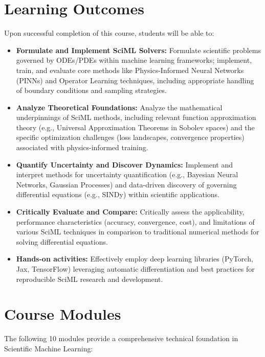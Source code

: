 \documentclass[11pt,fourier]{article}
\begin{document}
\section*{Learning Outcomes}
Upon successful completion of this course, students will be able to:
\begin{itemize}
    \item \textbf{Formulate and Implement SciML Solvers:} Formulate scientific problems governed by ODEs/PDEs within machine learning frameworks; implement, train, and evaluate core methods like Physics-Informed Neural Networks (PINNs) and Operator Learning techniques, including appropriate handling of boundary conditions and sampling strategies.
    \item \textbf{Analyze Theoretical Foundations:} Analyze the mathematical underpinnings of SciML methods, including relevant function approximation theory (e.g., Universal Approximation Theorems in Sobolev spaces) and the specific optimization challenges (loss landscapes, convergence properties) associated with physics-informed training.
    \item \textbf{Quantify Uncertainty and Discover Dynamics:} Implement and interpret methods for uncertainty quantification (e.g., Bayesian Neural Networks, Gaussian Processes) and data-driven discovery of governing differential equations (e.g., SINDy) within scientific applications.
    \item \textbf{Critically Evaluate and Compare:} Critically assess the applicability, performance characteristics (accuracy, convergence, cost), and limitations of various SciML techniques in comparison to traditional numerical methods for solving differential equations.
    \item \textbf{Hands-on activities:} Effectively employ deep learning libraries (PyTorch, Jax, TensorFlow) leveraging automatic differentiation and best practices for reproducible SciML research and development.
\end{itemize}

\section*{Course Modules}
The following 10 modules provide a comprehensive technical foundation in Scientific Machine Learning:
\end{document}
